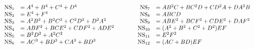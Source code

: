\begin{equation*}
  \begin{array}{rllrl}
{\rm NS}_1 &= A^4 + B^4 +C^4 +D^4 & \qquad & {\rm NS}_7 &= AB^2C +BC^2D +CD^2A +DA^2B  \\
{\rm NS}_2 &= E^4 +F^4  & \qquad & {\rm NS}_8 &= ABCD  \\
{\rm NS}_3 &= A^2 B^2 + B^2 C^2 + C^2 D^2 + D^2 A^2 & \qquad &  {\rm NS}_9 &= ABE^2 +BCF^2 +CDE^2+DAF^2\\
{\rm NS}_4 &= ABF^2 +BCE^2 +CDF^2 +ADE^2  & \qquad & {\rm NS}_{10} &= (A^2 +B^2 +C^2 +D^2)EF  \\
{\rm NS}_5 &= B^2 D^2 + A^2 C^2  & \qquad & {\rm NS}_{11} &= E^2 F^2  \\
{\rm NS}_6 &= AC^3 +BD^3 +CA^3 +BD^3   & \qquad & {\rm NS}_{12} &= (AC + BD) EF \\
  \end{array}
\end{equation*}

